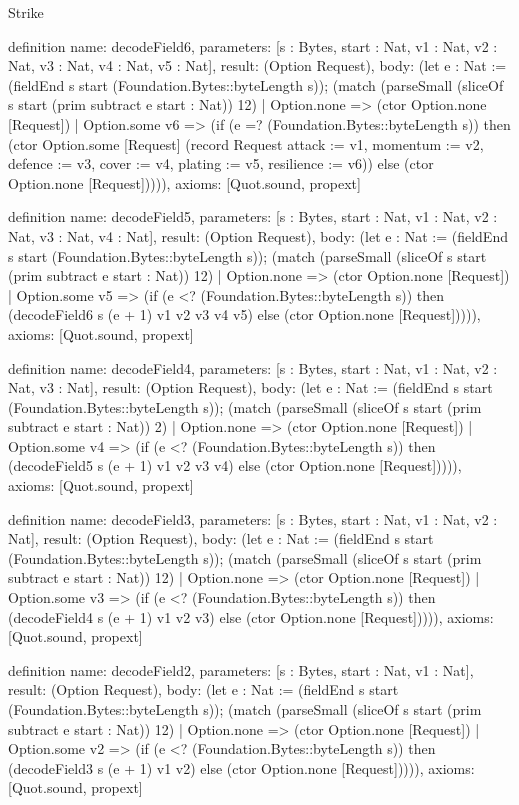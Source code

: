 \begin{lexlean}{Strike}
\begin{semanticmodule}
definition{
  name: decodeField6,
  parameters: [s : Bytes, start : Nat, v1 : Nat, v2 : Nat, v3 : Nat, v4 : Nat, v5 : Nat],
  result: (Option Request),
  body: (let e : Nat := (fieldEnd s start (Foundation.Bytes::byteLength s)); (match (parseSmall (sliceOf s start (prim subtract e start : Nat)) 12)
    | Option.none => (ctor Option.none [Request])
    | Option.some v6 => (if (e =? (Foundation.Bytes::byteLength s)) then (ctor Option.some [Request] (record Request {attack := v1, momentum := v2, defence := v3, cover := v4, plating := v5, resilience := v6})) else (ctor Option.none [Request])))),
  axioms: [Quot.sound, propext]
}

definition{
  name: decodeField5,
  parameters: [s : Bytes, start : Nat, v1 : Nat, v2 : Nat, v3 : Nat, v4 : Nat],
  result: (Option Request),
  body: (let e : Nat := (fieldEnd s start (Foundation.Bytes::byteLength s)); (match (parseSmall (sliceOf s start (prim subtract e start : Nat)) 12)
    | Option.none => (ctor Option.none [Request])
    | Option.some v5 => (if (e <? (Foundation.Bytes::byteLength s)) then (decodeField6 s (e + 1) v1 v2 v3 v4 v5) else (ctor Option.none [Request])))),
  axioms: [Quot.sound, propext]
}

definition{
  name: decodeField4,
  parameters: [s : Bytes, start : Nat, v1 : Nat, v2 : Nat, v3 : Nat],
  result: (Option Request),
  body: (let e : Nat := (fieldEnd s start (Foundation.Bytes::byteLength s)); (match (parseSmall (sliceOf s start (prim subtract e start : Nat)) 2)
    | Option.none => (ctor Option.none [Request])
    | Option.some v4 => (if (e <? (Foundation.Bytes::byteLength s)) then (decodeField5 s (e + 1) v1 v2 v3 v4) else (ctor Option.none [Request])))),
  axioms: [Quot.sound, propext]
}

definition{
  name: decodeField3,
  parameters: [s : Bytes, start : Nat, v1 : Nat, v2 : Nat],
  result: (Option Request),
  body: (let e : Nat := (fieldEnd s start (Foundation.Bytes::byteLength s)); (match (parseSmall (sliceOf s start (prim subtract e start : Nat)) 12)
    | Option.none => (ctor Option.none [Request])
    | Option.some v3 => (if (e <? (Foundation.Bytes::byteLength s)) then (decodeField4 s (e + 1) v1 v2 v3) else (ctor Option.none [Request])))),
  axioms: [Quot.sound, propext]
}

definition{
  name: decodeField2,
  parameters: [s : Bytes, start : Nat, v1 : Nat],
  result: (Option Request),
  body: (let e : Nat := (fieldEnd s start (Foundation.Bytes::byteLength s)); (match (parseSmall (sliceOf s start (prim subtract e start : Nat)) 12)
    | Option.none => (ctor Option.none [Request])
    | Option.some v2 => (if (e <? (Foundation.Bytes::byteLength s)) then (decodeField3 s (e + 1) v1 v2) else (ctor Option.none [Request])))),
  axioms: [Quot.sound, propext]
}


\end{semanticmodule}
\end{lexlean}
